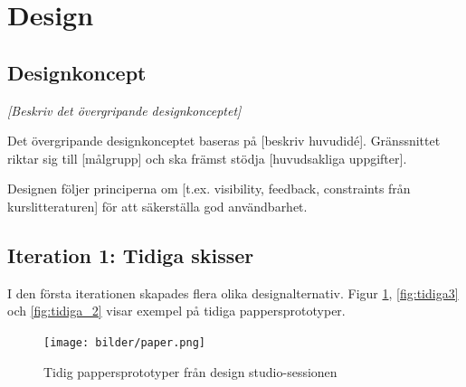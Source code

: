 \section{Design}

\subsection{Designkoncept}
\textit{[Beskriv det övergripande designkonceptet]}

Det övergripande designkonceptet baseras på [beskriv huvudidé]. Gränssnittet riktar sig till [målgrupp] och ska främst stödja [huvudsakliga uppgifter].

Designen följer principerna om [t.ex. visibility, feedback, constraints från kurslitteraturen] för att säkerställa god användbarhet.


\subsection{Iteration 1: Tidiga skisser}

I den första iterationen skapades flera olika designalternativ. Figur \ref{fig:tidiga_skisser}, \ref{fig:tidiga3} och \ref{fig:tidiga_2} visar exempel på tidiga pappersprototyper.

\begin{figure}[H]
    \centering
    \texttt{[image: bilder/paper.png]}
    \caption{Tidig pappersprototyper från design studio-sessionen}
    \label{fig:tidiga_skisser}
\end{figure}

